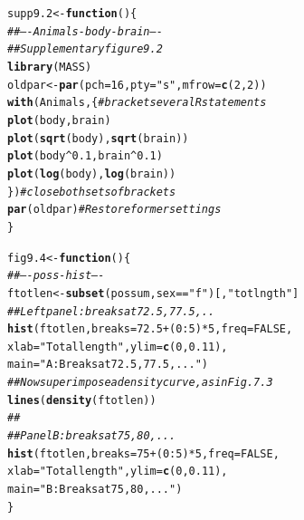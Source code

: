 \documentclass[12pt, a4paper,  BCOR=8.25mm, DIV=15]{scrartcl}\usepackage[]{graphicx}\usepackage[]{color}
\makeatletter
\newcommand{\hlnum}[1]{\textcolor[rgb]{0.686,0.059,0.569}{#1}}%
\newcommand{\hlstr}[1]{\textcolor[rgb]{0.192,0.494,0.8}{#1}}%
\newcommand{\hlcom}[1]{\textcolor[rgb]{0.678,0.584,0.686}{\textit{#1}}}%
\newcommand{\hlopt}[1]{\textcolor[rgb]{0,0,0}{#1}}%
\newcommand{\hlstd}[1]{\textcolor[rgb]{0.345,0.345,0.345}{#1}}%
\newcommand{\hlkwa}[1]{\textcolor[rgb]{0.161,0.373,0.58}{\textbf{#1}}}%
\newcommand{\hlkwb}[1]{\textcolor[rgb]{0.69,0.353,0.396}{#1}}%
\newcommand{\hlkwc}[1]{\textcolor[rgb]{0.333,0.667,0.333}{#1}}%
\newcommand{\hlkwd}[1]{\textcolor[rgb]{0.737,0.353,0.396}{\textbf{#1}}}%
\newenvironment{kframe}{%
 \def\at@end@of@kframe{}%
 \ifinner\ifhmode%
  \def\at@end@of@kframe{\end{minipage}}%
  \begin{minipage}{\columnwidth}%
 \fi\fi%
 \def\FrameCommand##1{\hskip\@totalleftmargin \hskip-\fboxsep
 \colorbox{shadecolor}{##1}\hskip-\fboxsep
     \hskip-\linewidth \hskip-\@totalleftmargin \hskip\columnwidth}%
 \MakeFramed {\advance\hsize-\width
   \@totalleftmargin\z@ \linewidth\hsize
   \@setminipage}}%
 {\par\unskip\endMakeFramed%
 \at@end@of@kframe}
\newenvironment{knitrout}{}{} %
\makeatother
\begin{document}
\begin{knitrout}
\color{fgcolor}\begin{kframe}
\begin{alltt}
\hlstd{supp9.2} \hlkwb{<-} \hlkwa{function}\hlstd{()\{}
\hlcom{## ---- Animals-body-brain ----}
\hlcom{## Supplementary figure 9.2}
\hlkwd{library}\hlstd{(MASS)}
\hlstd{oldpar} \hlkwb{<-} \hlkwd{par}\hlstd{(}\hlkwc{pch}\hlstd{=}\hlnum{16}\hlstd{,} \hlkwc{pty}\hlstd{=}\hlstr{"s"}\hlstd{,} \hlkwc{mfrow}\hlstd{=}\hlkwd{c}\hlstd{(}\hlnum{2}\hlstd{,}\hlnum{2}\hlstd{))}
\hlkwd{with}\hlstd{(Animals, \{}      \hlcom{# bracket several R statements}
  \hlkwd{plot}\hlstd{(body, brain)}
  \hlkwd{plot}\hlstd{(}\hlkwd{sqrt}\hlstd{(body),} \hlkwd{sqrt}\hlstd{(brain))}
  \hlkwd{plot}\hlstd{(body}\hlopt{^}\hlnum{0.1}\hlstd{, brain}\hlopt{^}\hlnum{0.1}\hlstd{)}
  \hlkwd{plot}\hlstd{(}\hlkwd{log}\hlstd{(body),} \hlkwd{log}\hlstd{(brain))}
\hlstd{\})}                   \hlcom{# close both sets of brackets}
\hlkwd{par}\hlstd{(oldpar)}          \hlcom{# Restore former settings}
\hlstd{\}}
\end{alltt}
\end{kframe}
\end{knitrout}

\begin{knitrout}
\color{fgcolor}\begin{kframe}
\begin{alltt}
\hlstd{fig9.4} \hlkwb{<-} \hlkwa{function}\hlstd{()\{}
\hlcom{## ---- poss-hist ----}
\hlstd{ftotlen} \hlkwb{<-} \hlkwd{subset}\hlstd{(possum, sex}\hlopt{==}\hlstr{"f"}\hlstd{)[,} \hlstr{"totlngth"}\hlstd{]}
\hlcom{## Left panel: breaks at 72.5, 77.5,..}
\hlkwd{hist}\hlstd{(ftotlen,} \hlkwc{breaks} \hlstd{=} \hlnum{72.5} \hlopt{+} \hlstd{(}\hlnum{0}\hlopt{:}\hlnum{5}\hlstd{)}\hlopt{*}\hlnum{5}\hlstd{,} \hlkwc{freq}\hlstd{=}\hlnum{FALSE}\hlstd{,}
     \hlkwc{xlab}\hlstd{=}\hlstr{"Total length"}\hlstd{,} \hlkwc{ylim}\hlstd{=}\hlkwd{c}\hlstd{(}\hlnum{0}\hlstd{,}\hlnum{0.11}\hlstd{),}
     \hlkwc{main} \hlstd{=}\hlstr{"A: Breaks at 72.5, 77.5,..."}\hlstd{)}
\hlcom{## Now superimpose a density curve, as in Fig. 7.3}
\hlkwd{lines}\hlstd{(}\hlkwd{density}\hlstd{(ftotlen))}
\hlcom{##}
\hlcom{## Panel B: breaks at 75, 80, ...}
\hlkwd{hist}\hlstd{(ftotlen,} \hlkwc{breaks} \hlstd{=} \hlnum{75} \hlopt{+} \hlstd{(}\hlnum{0}\hlopt{:}\hlnum{5}\hlstd{)}\hlopt{*}\hlnum{5}\hlstd{,} \hlkwc{freq}\hlstd{=}\hlnum{FALSE}\hlstd{,}
     \hlkwc{xlab}\hlstd{=}\hlstr{"Total length"}\hlstd{,} \hlkwc{ylim}\hlstd{=}\hlkwd{c}\hlstd{(}\hlnum{0}\hlstd{,}\hlnum{0.11}\hlstd{),}
     \hlkwc{main}\hlstd{=}\hlstr{"B: Breaks at 75, 80, ..."}\hlstd{)}
\hlstd{\}}
\end{alltt}
\end{kframe}
\end{knitrout}
\end{document}
